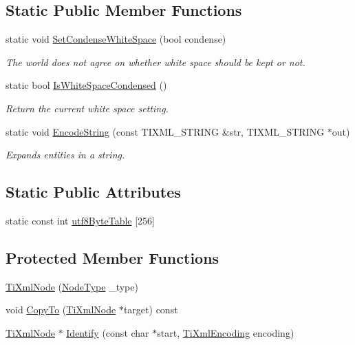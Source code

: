 \subsection*{Static Public Member Functions}
\begin{DoxyCompactItemize}
\item 
static void \hyperlink{classTiXmlBase_a0f799ec645bfb8d8a969e83478f379c1}{SetCondenseWhiteSpace} (bool condense)
\begin{DoxyCompactList}\small\item\em The world does not agree on whether white space should be kept or not. \item\end{DoxyCompactList}\item 
static bool \hyperlink{classTiXmlBase_ad4b1472531c647a25b1840a87ae42438}{IsWhiteSpaceCondensed} ()
\begin{DoxyCompactList}\small\item\em Return the current white space setting. \item\end{DoxyCompactList}\item 
static void \hyperlink{classTiXmlBase_a32ed202562b58de64c7d799ca3c9db98}{EncodeString} (const TIXML\_\-STRING \&str, TIXML\_\-STRING $\ast$out)
\begin{DoxyCompactList}\small\item\em Expands entities in a string. \item\end{DoxyCompactList}\end{DoxyCompactItemize}
\subsection*{Static Public Attributes}
\begin{DoxyCompactItemize}
\item 
static const int \hyperlink{classTiXmlBase_ac8c86058137bdb4b413c3eca58f2d467}{utf8ByteTable} \mbox{[}256\mbox{]}
\end{DoxyCompactItemize}
\subsection*{Protected Member Functions}
\begin{DoxyCompactItemize}
\item 
\hyperlink{classTiXmlNode_a3f46721695868667113c7487ff123f20}{TiXmlNode} (\hyperlink{classTiXmlNode_a836eded4920ab9e9ef28496f48cd95a2}{NodeType} \_\-type)
\item 
void \hyperlink{classTiXmlNode_ab6056978923ad8350fb5164af32d8038}{CopyTo} (\hyperlink{classTiXmlNode}{TiXmlNode} $\ast$target) const 
\item 
\hyperlink{classTiXmlNode}{TiXmlNode} $\ast$ \hyperlink{classTiXmlNode_ac1e3a8e7578be463b04617786120c2bb}{Identify} (const char $\ast$start, \hyperlink{tinyxml_8h_a88d51847a13ee0f4b4d320d03d2c4d96}{TiXmlEncoding} encoding)
\end{DoxyCompactItemize}
